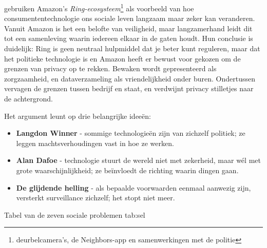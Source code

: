 \documentclass[nonacm,sigconf]{acmart}
\begin{document}
    \parencite{selinger2022amazon} gebruiken Amazon's \textit{Ring-ecosysteem}\footnote{deurbelcamera's, de Neighbors-app en samenwerkingen met de politie} als voorbeeld van hoe consumententechnologie ons sociale leven langzaam maar zeker kan veranderen.
    Vanuit Amazon is het een belofte van veiligheid, maar langzamerhand leidt dit tot een samenleving waarin iedereen elkaar in de gaten houdt.
    Hun conclusie is duidelijk: Ring is geen neutraal hulpmiddel dat je beter kunt reguleren, maar dat het politieke technologie is en Amazon heeft er bewust voor gekozen om de grenzen van privacy op te rekken.
    Bewaken wordt gepresenteerd als zorgzaamheid, en dataverzameling als vriendelijkheid onder buren.
    Ondertussen vervagen de grenzen tussen bedrijf en staat, en verdwijnt privacy stilletjes naar de achtergrond.

    \vertspace

    \noindent Het argument leunt op drie belangrijke ideeën:
    \begin{itemize}
        \item \textbf{Langdon Winner} - sommige technologieën zijn van zichzelf politiek; ze leggen machtsverhoudingen vast in hoe ze werken.
        \item \textbf{Alan Dafoe} - technologie stuurt de wereld niet met zekerheid, maar wél met grote waarschijnlijkheid; ze beïnvloedt de richting waarin dingen gaan.
        \item \textbf{De glijdende helling} - als bepaalde voorwaarden eenmaal aanwezig zijn, versterkt surveillance zichzelf; het stopt niet meer.
    \end{itemize}

    \vertspace

    \SimpleTable
    {Tabel van de zeven sociale problemen}
    {tab:sel}
    {
    }
\end{document}

